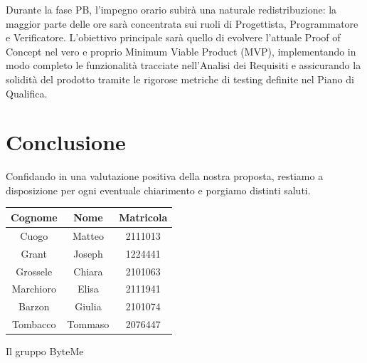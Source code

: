 \documentclass[11pt,a4paper]{article}
\begin{document}
Durante la fase PB, l'impegno orario subirà una naturale redistribuzione: la maggior parte delle ore sarà concentrata sui ruoli di Progettista, Programmatore e Verificatore. L'obiettivo principale sarà quello di evolvere l'attuale Proof of Concept nel vero e proprio Minimum Viable Product (MVP), implementando in modo completo le funzionalità tracciate nell'Analisi dei Requisiti e assicurando la solidità del prodotto tramite le rigorose metriche di testing definite nel Piano di Qualifica.


\newpage
\section{Conclusione}
Confidando in una valutazione positiva della nostra proposta, restiamo a disposizione per ogni eventuale chiarimento e porgiamo distinti saluti.

\begin{table}[H]
    \centering
    \begin{tabular}{|c|c|c|}
        \hline
        \textbf{Cognome} & \textbf{Nome} & \textbf{Matricola} \\
        \hline
        Cuogo & Matteo & 2111013 \\
        \hline
        Grant & Joseph & 1224441 \\
        \hline
        Grossele & Chiara & 2101063 \\
        \hline
        Marchioro & Elisa & 2111941 \\
        \hline
        Barzon & Giulia & 2101074 \\
        \hline
        Tombacco & Tommaso & 2076447 \\
        \hline
    \end{tabular}
\end{table}

\hfill Il gruppo ByteMe
\end{document}
